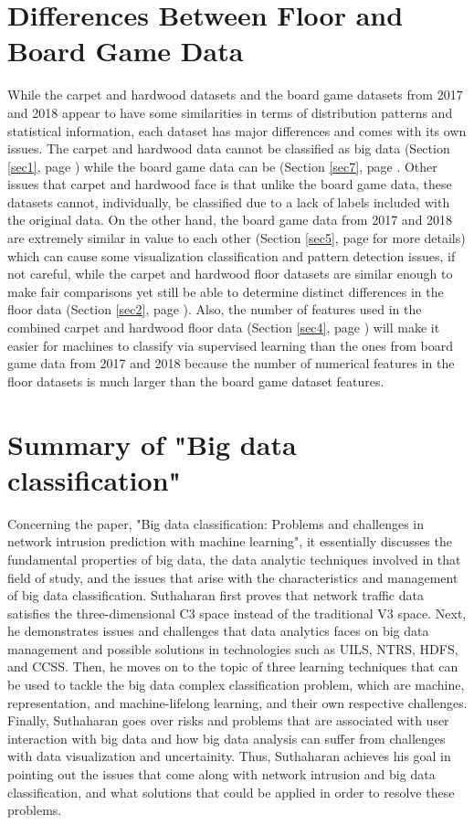 \documentclass[a4paper,12pt]{IEEEtran}
\begin{document}
\section{Differences Between Floor and Board Game Data}
While the carpet and hardwood datasets and the board game datasets from 2017 and 2018 appear to have some similarities in terms of distribution patterns and statistical information, each dataset has major differences and comes with its own issues. The carpet and hardwood data cannot be classified as big data (Section \ref{sec1}, page \pageref{sec1}) while the board game data can be (Section \ref{sec7}, page \pageref{sec7}. Other issues that carpet and hardwood face is that unlike the board game data, these datasets cannot, individually, be classified due to a lack of labels included with the original data. On the other hand, the board game data from 2017 and 2018 are extremely similar in value to each other (Section \ref{sec5}, page \pageref{sec5} for more details) which can cause some visualization classification and pattern detection issues, if not careful, while the carpet and hardwood floor datasets are similar enough to make fair comparisons yet still be able to determine distinct differences in the floor data (Section \ref{sec2}, page \pageref{sec2}). Also, the number of features used in the combined carpet and hardwood floor data (Section \ref{sec4}, page \pageref{sec4}) will make it easier for machines to classify via supervised learning than the ones from board game data from 2017 and 2018 because the number of numerical features in the floor datasets is much larger than the board game dataset features.

\section{Summary of "Big data classification"}
Concerning the paper, "Big data classification: Problems and challenges in network intrusion prediction with machine learning", it essentially discusses the fundamental properties of big data, the data analytic techniques involved in that field of study, and the issues that arise with the characteristics and management of big data classification. Suthaharan first proves that network traffic data satisfies the three-dimensional C3 space instead of the traditional V3 space. Next, he demonstrates issues and challenges that data analytics faces on big data management and possible solutions in technologies such as UILS, NTRS, HDFS, and CCSS. Then, he moves on to the topic of three learning techniques that can be used to tackle the big data complex classification problem, which are machine, representation, and machine-lifelong learning, and their own respective challenges. Finally, Suthaharan goes over risks and problems that are associated with user interaction with big data and how big data analysis can suffer from challenges with data visualization and uncertainity. Thus, Suthaharan achieves his goal in pointing out the issues that come along with network intrusion and big data classification, and what solutions that could be applied in order to resolve these problems.
\label{sec8}
\end{document}
